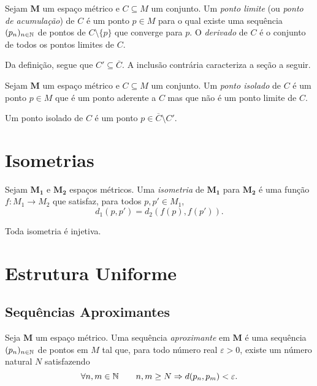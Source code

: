 \begin{defi}
Sejam $\bm M$ um espaço métrico e $C \subseteq M$ um conjunto. Um \emph{ponto limite} (ou \emph{ponto de acumulação}) de $C$ é um ponto $p \in M$ para o qual existe uma sequência $(p_n)_{n \in \mathbb{N}}$ de pontos de $C \setminus \{p\}$ que converge para $p$. O \emph{derivado} de $C$ é o conjunto de todos os pontos limites de $C$. 
\end{defi}

Da definição, segue que $C' \subseteq \overline C$. A inclusão contrária caracteriza a seção a seguir.

\begin{defi}
Sejam $\bm M$ um espaço métrico e $C \subseteq M$ um conjunto. Um \emph{ponto isolado} de $C$ é um ponto $p \in M$ que é um ponto aderente a $C$ mas que não é um ponto limite de $C$.
\end{defi}

Um ponto isolado de $C$ é um ponto $p \in \overline C \setminus C'$.

\section{Isometrias}

\begin{defi}
Sejam $\bm{M_1}$ e $\bm{M_2}$ espaços métricos. Uma \emph{isometria} de $\bm{M_1}$ para $\bm{M_2}$ é uma função $f: M_1 \to M_2$ que satisfaz, para todos $p,p' \in M_1$,
	\begin{equation*}
	d_1(p,p') = d_2(f(p),f(p')).
	\end{equation*}
\end{defi}

\begin{prop}
Toda isometria é injetiva.
\end{prop}

\section{Estrutura Uniforme}

\subsection{Sequências Aproximantes}

\begin{defi}
Seja $\bm M$ um espaço métrico. Uma sequência \emph{aproximante} em $\bm M$ é uma sequência $(p_n)_{n \in \mathbb{N}}$ de pontos em $M$ tal que, para todo número real $\varepsilon > 0$, existe um número natural $N$ satisfazendo
	\begin{equation*}
	\forall n,m \in \mathbb{N} \qquad n,m \geq N \Rightarrow d(p_n,p_m) < \varepsilon.
	\end{equation*}
\end{defi}


